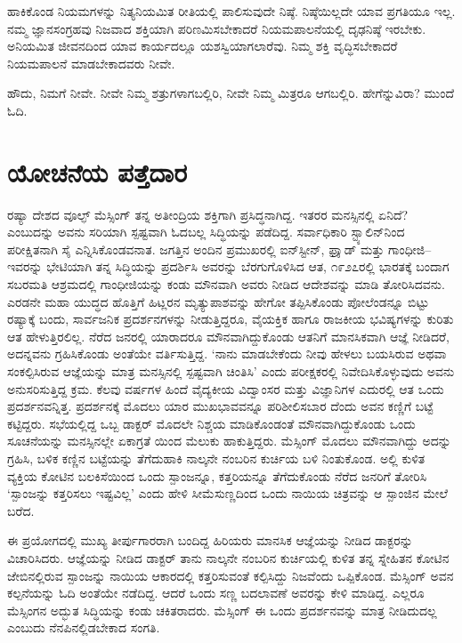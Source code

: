 ಹಾಕಿಕೊಂಡ ನಿಯಮಗಳನ್ನು ನಿತ್ಯನಿಯಮಿತ ರೀತಿಯಲ್ಲಿ ಪಾಲಿಸುವುದೇ ನಿಷ್ಠೆ. ನಿಷ್ಠೆ\-ಯಿಲ್ಲದೇ ಯಾವ ಪ್ರಗತಿಯೂ ಇಲ್ಲ. ನಮ್ಮ ಜ್ಞಾನಸಂಗ್ರಹವು ನಿಜವಾದ ಶಕ್ತಿಯಾಗಿ ಪರಿಣಮಿಸ\-ಬೇಕಾದರೆ ನಿಯಮಪಾಲನೆಯಲ್ಲಿ ದೃಢನಿಷ್ಠೆ ಇರಬೇಕು. ಅನಿಯಮಿತ ಜೀವನದಿಂದ ಯಾವ ಕಾರ್ಯದಲ್ಲೂ ಯಶಸ್ವಿಯಾಗಲಾರೆವು. ನಿಮ್ಮ ಶಕ್ತಿ ವೃದ್ಧಿಸಬೇಕಾದರೆ ನಿಯಮಪಾಲನೆ ಮಾಡ\-ಬೇಕಾದವರು ನೀವೇ.

ಹೌದು, ನಿಮಗೆ ನೀವೇ. ನೀವೇ ನಿಮ್ಮ ಶತ್ರುಗಳಾಗಬಲ್ಲಿರಿ, ನೀವೇ ನಿಮ್ಮ ಮಿತ್ರರೂ ಆಗಬಲ್ಲಿರಿ. ಹೇಗೆನ್ನುವಿರಾ? ಮುಂದೆ ಓದಿ.


\section*{ಯೋಚನೆಯ ಪತ್ತೆದಾರ}


ರಷ್ಯಾ ದೇಶದ ವೂಲ್ಫ್ ಮೆಸ್ಸಿಂಗ್ ತನ್ನ ಅತೀಂದ್ರಿಯ ಶಕ್ತಿಗಾಗಿ ಪ್ರಸಿದ್ಧನಾಗಿದ್ದ. ಇತರರ ಮನಸ್ಸಿನಲ್ಲಿ ಏನಿದೆ? ಎಂಬುದನ್ನು ಅವನು ಸರಿಯಾಗಿ ಸ್ಪಷ್ಟವಾಗಿ ಓದಬಲ್ಲ ಸಿದ್ಧಿಯನ್ನು ಪಡೆದಿದ್ದ. ಸರ್ವಾಧಿಕಾರಿ ಸ್ಟ್ಯಾಲಿನ್​ನಿಂದ ಪರೀಕ್ಷಿತನಾಗಿ ಸೈ ಎನ್ನಿಸಿಕೊಂಡವನಾತ. ಜಗತ್ತಿನ ಅಂದಿನ ಪ್ರಮುಖರಲ್ಲಿ ಐನ್​ಸ್ಟೀನ್, ಫ್ರಾೖಡ್ ಮತ್ತು ಗಾಂಧೀಜಿ–ಇವರನ್ನು ಭೇಟಿಯಾಗಿ ತನ್ನ ಸಿದ್ಧಿಯನ್ನು ಪ್ರದರ್ಶಿಸಿ ಅವರನ್ನು ಬೆರಗುಗೊಳಿಸಿದ ಆತ, ೧೯೨೭ರಲ್ಲಿ ಭಾರತಕ್ಕೆ ಬಂದಾಗ ಸಬರಮತಿ ಆಶ್ರಮದಲ್ಲಿ ಗಾಂಧೀಜಿಯನ್ನು ಕಂಡು ಮೌನವಾಗಿ ಅವರು ನೀಡಿದ ಆದೇಶವನ್ನು ಮಾಡಿ ತೋರಿಸಿದವನು. ಎರಡನೇ ಮಹಾ ಯುದ್ಧದ ಹೊತ್ತಿಗೆ ಹಿಟ್ಲರನ ಮೃತ್ಯುಪಾಶವನ್ನು ಹೇಗೋ ತಪ್ಪಿಸಿಕೊಂಡು ಪೋಲೆಂಡನ್ನೂ ಬಿಟ್ಟು ರಷ್ಯಾಕ್ಕೆ ಬಂದು, ಸಾರ್ವಜನಿಕ ಪ್ರದರ್ಶನಗಳನ್ನು ನೀಡುತ್ತಿದ್ದರೂ, ವೈಯಕ್ತಿಕ ಹಾಗೂ ರಾಜಕೀಯ ಭವಿಷ್ಯಗಳನ್ನು ಕುರಿತು ಆತ ಹೇಳುತ್ತಿರಲಿಲ್ಲ. ನೆರೆದ ಜನರಲ್ಲಿ ಯಾರಾದರೂ ಮೌನವಾಗಿದ್ದುಕೊಂಡು ಆತನಿಗೆ ಮಾನಸಿಕವಾಗಿ ಆಜ್ಞೆ ನೀಡಿದರೆ, ಅದನ್ನವನು ಗ್ರಹಿಸಿಕೊಂಡು ಅಂತೆಯೇ ವರ್ತಿಸುತ್ತಿದ್ದ. ‘ನಾನು ಮಾಡಬೇಕೆಂದು ನೀವು ಹೇಳಲು ಬಯಸಿರುವ ಅಥವಾ ಸಂಕಲ್ಪಿಸಿರುವ ಆಜ್ಞೆಯನ್ನು ಮಾತ್ರ ಮನಸ್ಸಿನಲ್ಲಿ ಸ್ಪಷ್ಟವಾಗಿ ಚಿಂತಿಸಿ’ ಎಂದು ಪರೀಕ್ಷಕರಲ್ಲಿ ನಿವೇದಿಸಿಕೊಳ್ಳುವುದು ಅವನು ಅನುಸರಿಸುತ್ತಿದ್ದ ಕ್ರಮ. ಕೆಲವು ವರ್ಷಗಳ ಹಿಂದೆ ವೈದ್ಯಕೀಯ ವಿದ್ವಾಂಸರ ಮತ್ತು ವಿಜ್ಞಾನಿಗಳ ಎದುರಲ್ಲಿ ಆತ ಒಂದು ಪ್ರದರ್ಶನವನ್ನಿತ್ತ. ಪ್ರದರ್ಶನಕ್ಕೆ ಮೊದಲು ಯಾರ ಮುಖಭಾವವನ್ನೂ ಪರಿಶೀಲಿಸಬಾರ ದೆಂದು ಅವನ ಕಣ್ಣಿಗೆ ಬಟ್ಟೆ ಕಟ್ಟಿದ್ದರು. ಸಭೆಯಲ್ಲಿದ್ದ ಒಬ್ಬ ಡಾಕ್ಟರ್ ಮೊದಲೇ ನಿಶ್ಚಯ ಮಾಡಿಕೊಂಡಂತೆ ಮೌನವಾಗಿದ್ದುಕೊಂಡು ಒಂದು ಸೂಚನೆಯನ್ನು ಮನಸ್ಸಿನಲ್ಲೇ ಏಕಾಗ್ರತೆ ಯಿಂದ ಮೆಲುಕು ಹಾಕುತ್ತಿದ್ದರು. ಮೆಸ್ಸಿಂಗ್ ಮೊದಲು ಮೌನವಾಗಿದ್ದು ಅದನ್ನು ಗ್ರಹಿಸಿ, ಬಳಿಕ ಕಣ್ಣಿನ ಬಟ್ಟೆಯನ್ನು ತೆಗೆದುಹಾಕಿ ನಾಲ್ಕನೇ ನಂಬರಿನ ಕುರ್ಚಿಯ ಬಳಿ ನಿಂತುಕೊಂಡ. ಅಲ್ಲಿ ಕುಳಿತ ವ್ಯಕ್ತಿಯ ಕೋಟಿನ ಬಲಕಿಸೆಯಿಂದ ಒಂದು ಸ್ಪಾಂಜನ್ನೂ, ಕತ್ತರಿಯನ್ನೂ ತೆಗೆದುಕೊಂಡು ನೆರೆದ ಜನರಿಗೆ ತೋರಿಸಿ ‘ಸ್ಪಾಂಜನ್ನು ಕತ್ತರಿಸಲು ಇಷ್ಟವಿಲ್ಲ’ ಎಂದು ಹೇಳಿ ಸೀಮೆಸುಣ್ಣದಿಂದ ಒಂದು ನಾಯಿಯ ಚಿತ್ರವನ್ನು ಆ ಸ್ಪಾಂಜಿನ ಮೇಲೆ ಬರೆದ.

ಈ ಪ್ರಯೋಗದಲ್ಲಿ ಮುಖ್ಯ ತೀರ್ಪುಗಾರರಾಗಿ ಬಂದಿದ್ದ ಹಿರಿಯರು ಮಾನಸಿಕ ಆಜ್ಞೆಯನ್ನು ನೀಡಿದ ಡಾಕ್ಟರನ್ನು ವಿಚಾರಿಸಿದರು. ಆಜ್ಞೆಯನ್ನು ನೀಡಿದ ಡಾಕ್ಟರ್ ತಾನು ನಾಲ್ಕನೇ ನಂಬರಿನ ಕುರ್ಚಿಯಲ್ಲಿ ಕುಳಿತ ತನ್ನ ಸ್ನೇಹಿತನ ಕೋಟಿನ ಜೇಬಿನಲ್ಲಿರುವ ಸ್ಪಾಂಜನ್ನು ನಾಯಿಯ ಆಕಾರದಲ್ಲಿ ಕತ್ತರಿಸುವಂತೆ ಕಲ್ಪಿಸಿದ್ದು ನಿಜವೆಂದು ಒಪ್ಪಿಕೊಂಡ. ಮೆಸ್ಸಿಂಗ್ ಅವನ ಕಲ್ಪನೆಯನ್ನು ಓದಿ ಅಂತೆಯೇ ನಡೆದಿದ್ದ. ಆದರೆ ಒಂದು ಸಣ್ಣ ಬದಲಾವಣೆ ಅವರನ್ನು ಕೇಳಿ ಮಾಡಿದ್ದ. ಎಲ್ಲರೂ ಮೆಸ್ಸಿಂಗನ ಅದ್ಭುತ ಸಿದ್ಧಿಯನ್ನು ಕಂಡು ಚಕಿತರಾದರು. ಮೆಸ್ಸಿಂಗ್ ಈ ಒಂದು ಪ್ರದರ್ಶನವನ್ನು ಮಾತ್ರ ನೀಡಿದುದಲ್ಲ ಎಂಬುದು ನೆನಪಿನಲ್ಲಿಡಬೇಕಾದ ಸಂಗತಿ.

